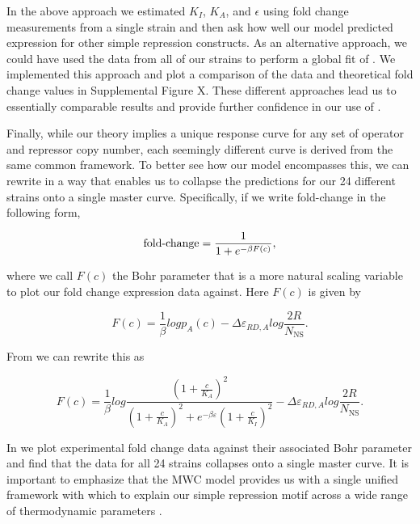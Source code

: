 In the above approach we estimated $K_I$, $K_A$, and $\epsilon$ using fold change measurements from a single strain and then ask how well our model predicted expression for other simple repression constructs. As an alternative approach, we could have used the data from all of our strains to perform a global fit of \eref[eq7]. We implemented this approach and plot a comparison of the data and theoretical fold change values in Supplemental Figure X. These different approaches lead us to essentially comparable results and provide further confidence in our use of \eref[eq7].

 Finally, while our theory implies a unique
response curve for any set of operator and repressor copy number, each seemingly
different curve is derived from the same common framework. To
better see how our model encompasses this, we can rewrite \eref[eq7] in a way
that enables us to collapse the predictions for our 24 different strains onto a
single master curve. Specifically, if we write fold-change in the following
form,

\begin{equation}\label{eq8}
\operatorname{fold-change}= \frac{1}{1+e^{-\beta F(c)}} ,
\end{equation}

\noindent where we call $F(c)$ the Bohr parameter \cite{Phillips2016} that is a more natural scaling variable to plot our fold change expression data against. Here $F(c)$ is given by 


\begin{equation}\label{eq9}
F(c) =  \frac{1}{\beta} log p_A(c)
- \Delta\varepsilon_{RD,A}
log \frac{2R}{N_{\text{NS}}} .
\end{equation}

From \eref[eq6v2] we can rewrite this as

\begin{equation}\label{eq10}
F(c) = \frac{1}{\beta} log \frac{\left(1+\frac{c}{K_A}\right)^2}{\left(1+\frac{c}{K_A}\right)^2+e^{-\beta  \varepsilon }\left(1+\frac{c}{K_I}\right)^2} - \Delta\varepsilon_{RD,A} log \frac{2R}{N_{\text{NS}}} .
\end{equation}

In  we plot experimental fold change data against their
associated Bohr parameter and find that the data for all 24 strains collapses onto a single master curve. It is important to emphasize that the MWC model provides us with a
single unified framework with which to explain our simple repression motif
across a wide range of thermodynamic parameters .

